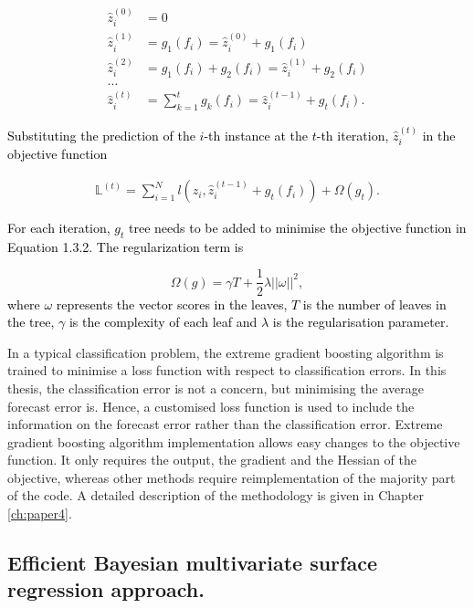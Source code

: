 \documentclass{monashthesis}
\begin{document}
\vspace*{-\baselineskip}

\begin{align*} 
\hat{z}_i^{(0)} &=  0 \\ 
\hat{z}_i^{(1)} &=  g_1(f_i) =  \hat{z}_i^{(0)}+g_1(f_i)\\ 
\hat{z}_i^{(2)} &=  g_1(f_i)+g_2(f_i) =  \hat{z}_i^{(1)}+g_2(f_i)\\ 
\dots\\
\hat{z}_i^{(t)} &=  \sum_{k=1}^{t}g_k(f_i) =  \hat{z}_i^{(t-1)}+g_t(f_i).
\end{align*}

\textcolor{black}{Substituting the prediction of the $i$-th instance at the $t$-th iteration, $\hat{z}_i^{(t)}$ in the objective function }

\vspace*{-\baselineskip}

\begin{align}
\mathbb{L}^{(t)}= \sum_{i=1}^{N} l(z_i, \hat{z}_i^{(t-1)}+g_t(f_i))+\Omega(g_t).
\end{align}

\textcolor{black}{For each iteration, $g_t$ tree needs to be added to minimise the objective function in Equation 1.3.2. The regularization term is}
\vspace*{-\baselineskip}

\[\Omega(g) = \gamma T + \frac{1}{2}\lambda||\omega||^2,\]
\textcolor{black}{where $\omega$ represents the vector scores in the leaves, $T$ is the number of leaves in the tree, $\gamma$ is the complexity of each leaf and $\lambda$ is the regularisation parameter.}

In a typical classification problem, the extreme gradient boosting algorithm is trained to minimise a loss function with respect to classification errors. In this thesis, the classification error is not a concern, but minimising the average forecast error is. Hence, a customised loss function is used to include the information on the forecast error rather than the classification error. Extreme gradient boosting algorithm implementation allows easy changes to the objective function. It only requires the output, the gradient and the Hessian of the objective, whereas other methods require reimplementation of the majority part of the code. A detailed description of the methodology is given in Chapter \ref{ch:paper4}.

\hypertarget{efficient-bayesian-multivariate-surface-regression-approach.}{%
\subsection{Efficient Bayesian multivariate surface regression approach.}\label{efficient-bayesian-multivariate-surface-regression-approach.}}
\end{document}
